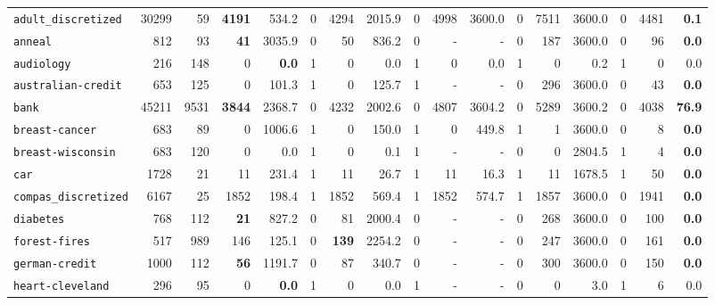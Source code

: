 \begin{tabular}{lccrrrrrrrrrrrrrr}
\texttt{adult\_discretized} & \multicolumn{1}{r}{30299} & \multicolumn{1}{r}{59}  & \textbf{4191} & 534.2 & 0 & 4294 & 2015.9 & 0 & 4998 & 3600.0 & 0 & 7511 & 3600.0 & 0 & 4481 & \textbf{0.1}\\
\texttt{anneal} & \multicolumn{1}{r}{812} & \multicolumn{1}{r}{93}  & \textbf{41} & 3035.9 & 0 & 50 & 836.2 & 0 & - & - & 0 & 187 & 3600.0 & 0 & 96 & \textbf{0.0}\\
\texttt{audiology} & \multicolumn{1}{r}{216} & \multicolumn{1}{r}{148}  & 0 & \textbf{0.0} & 1 & 0 & 0.0 & 1 & 0 & 0.0 & 1 & 0 & 0.2 & 1 & 0 & 0.0\\
\texttt{australian-credit} & \multicolumn{1}{r}{653} & \multicolumn{1}{r}{125}  & 0 & 101.3 & 1 & 0 & 125.7 & 1 & - & - & 0 & 296 & 3600.0 & 0 & 43 & \textbf{0.0}\\
\texttt{bank} & \multicolumn{1}{r}{45211} & \multicolumn{1}{r}{9531}  & \textbf{3844} & 2368.7 & 0 & 4232 & 2002.6 & 0 & 4807 & 3604.2 & 0 & 5289 & 3600.2 & 0 & 4038 & \textbf{76.9}\\
\texttt{breast-cancer} & \multicolumn{1}{r}{683} & \multicolumn{1}{r}{89}  & 0 & 1006.6 & 1 & 0 & 150.0 & 1 & 0 & 449.8 & 1 & 1 & 3600.0 & 0 & 8 & \textbf{0.0}\\
\texttt{breast-wisconsin} & \multicolumn{1}{r}{683} & \multicolumn{1}{r}{120}  & 0 & 0.0 & 1 & 0 & 0.1 & 1 & - & - & 0 & 0 & 2804.5 & 1 & 4 & \textbf{0.0}\\
\texttt{car} & \multicolumn{1}{r}{1728} & \multicolumn{1}{r}{21}  & 11 & 231.4 & 1 & 11 & 26.7 & 1 & 11 & 16.3 & 1 & 11 & 1678.5 & 1 & 50 & \textbf{0.0}\\
\texttt{compas\_discretized} & \multicolumn{1}{r}{6167} & \multicolumn{1}{r}{25}  & 1852 & 198.4 & 1 & 1852 & 569.4 & 1 & 1852 & 574.7 & 1 & 1857 & 3600.0 & 0 & 1941 & \textbf{0.0}\\
\texttt{diabetes} & \multicolumn{1}{r}{768} & \multicolumn{1}{r}{112}  & \textbf{21} & 827.2 & 0 & 81 & 2000.4 & 0 & - & - & 0 & 268 & 3600.0 & 0 & 100 & \textbf{0.0}\\
\texttt{forest-fires} & \multicolumn{1}{r}{517} & \multicolumn{1}{r}{989}  & 146 & 125.1 & 0 & \textbf{139} & 2254.2 & 0 & - & - & 0 & 247 & 3600.0 & 0 & 161 & \textbf{0.0}\\
\texttt{german-credit} & \multicolumn{1}{r}{1000} & \multicolumn{1}{r}{112}  & \textbf{56} & 1191.7 & 0 & 87 & 340.7 & 0 & - & - & 0 & 300 & 3600.0 & 0 & 150 & \textbf{0.0}\\
\texttt{heart-cleveland} & \multicolumn{1}{r}{296} & \multicolumn{1}{r}{95}  & 0 & \textbf{0.0} & 1 & 0 & 0.0 & 1 & - & - & 0 & 0 & 3.0 & 1 & 6 & 0.0\\

\end{tabular}
